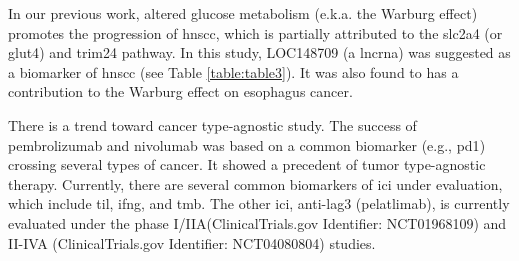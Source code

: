 \documentclass[cancers,article,submit,moreauthors,pdftex]{Definitions/mdpi}
\begin{document}
\begin{paracol}{2}
In our previous work, altered glucose metabolism (e.k.a. the Warburg effect\cite{Warburg1956}) promotes the progression of \acrshort{hnscc}, which is partially attributed to the \acrfull{slc2a4} (or \acrfull{glut4}) and \acrfull{trim24} pathway\cite{Chang2017b}. In this study, LOC148709 (a \acrfull{lncrna}) was suggested as a biomarker of \acrshort{hnscc} (see Table \ref{table:table3}).
It was also found to has a contribution to the Warburg effect on esophagus cancer\cite{Liu2019}. 

There is a trend toward cancer type-agnostic study. The success of pembrolizumab and nivolumab was based on a common biomarker (e.g., \acrshort{pd1}) crossing several types of cancer.
It showed a precedent of tumor type-agnostic therapy\cite{Yan2018}.
Currently, there are several common biomarkers of \acrshort{ici} under evaluation, which include \acrfull{til}, \acrfull{ifng}, and \acrfull{tmb}\cite{Gavrielatou2020}.
The other  \acrshort{ici}, anti-\acrshort{lag3} (pelatlimab), is currently evaluated under the phase I/IIA\cite{Cristina2019}(ClinicalTrials.gov Identifier: NCT01968109) and II-IVA\cite{Neal2019} (ClinicalTrials.gov Identifier: NCT04080804) studies.


\end{paracol}
\end{document}

